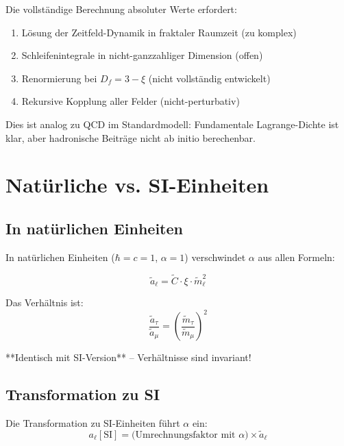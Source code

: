 	Die vollständige Berechnung absoluter Werte erfordert:
	\begin{enumerate}
		\item Lösung der Zeitfeld-Dynamik in fraktaler Raumzeit (zu komplex)
		\item Schleifenintegrale in nicht-ganzzahliger Dimension (offen)
		\item Renormierung bei $D_f = 3 - \xi$ (nicht vollständig entwickelt)
		\item Rekursive Kopplung aller Felder (nicht-perturbativ)
	\end{enumerate}
	
	Dies ist analog zu QCD im Standardmodell: Fundamentale Lagrange-Dichte ist klar, 
	aber hadronische Beiträge nicht ab initio berechenbar.
	
	\section{Natürliche vs. SI-Einheiten}
	
	\subsection{In natürlichen Einheiten}
	
	In natürlichen Einheiten ($\hbar = c = 1$, $\alpha = 1$) verschwindet $\alpha$ 
	aus allen Formeln:
	
	\begin{equation}
		\tilde{a}_\ell = \tilde{C} \cdot \xi \cdot \tilde{m}_\ell^2
		\label{eq:natural_units}
	\end{equation}
	
	Das Verhältnis ist:
	\begin{equation}
		\frac{\tilde{a}_\tau}{\tilde{a}_\mu} = \left(\frac{\tilde{m}_\tau}{\tilde{m}_\mu}\right)^2
	\end{equation}
	
	**Identisch mit SI-Version** – Verhältnisse sind invariant!
	
	\subsection{Transformation zu SI}
	
	Die Transformation zu SI-Einheiten führt $\alpha$ ein:
	\begin{equation}
		a_\ell[\text{SI}] = \text{(Umrechnungsfaktor mit } \alpha\text{)} \times \tilde{a}_\ell
	\end{equation}
	
